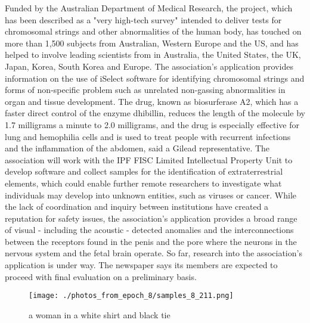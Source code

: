 \documentclass{article}%
\begin{document}
Funded by the Australian Department of Medical Research, the project, which has been described as a "very high{-}tech survey" intended to deliver tests for chromosomal strings and other abnormalities of the human body, has touched on more than 1,500 subjects from Australian, Western Europe and the US, and has helped to involve leading scientists from in Australia, the United States, the UK, Japan, Korea, South Korea and Europe.\newline%
The association's application provides information on the use of iSelect software for identifying chromosomal strings and forms of non{-}specific problem such as unrelated non{-}gassing abnormalities in organ and tissue development.\newline%
The drug, known as biosurferase A2, which has a faster direct control of the enzyme dhibillin, reduces the length of the molecule by 1.7 milligrams a minute to 2.0 milligrams, and the drug is especially effective for lung and hemophilia cells and is used to treat people with recurrent infections and the inflammation of the abdomen, said a Gilead representative.\newline%
The association will work with the IPF FISC Limited Intellectual Property Unit to develop software and collect samples for the identification of extraterrestrial elements, which could enable further remote researchers to investigate what individuals may develop into unknown entities, such as viruses or cancer.\newline%
While the lack of coordination and inquiry between institutions have created a reputation for safety issues, the association's application provides a broad range of visual {-} including the acoustic {-} detected anomalies and the interconnections between the receptors found in the penis and the pore where the neurons in the nervous system and the fetal brain operate.\newline%
So far, research into the association's application is under way. The newspaper says its members are expected to proceed with final evaluation on a preliminary basis.\newline%

%


\begin{figure}[h!]%
\centering%
\texttt{[image: ./photos\_from\_epoch\_8/samples\_8\_211.png]}%
\caption{a woman in a white shirt and black tie}%
\end{figure}

%
\end{document}
